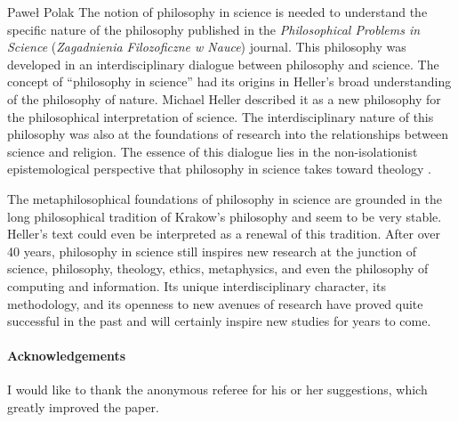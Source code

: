 \begin{artengenv}{Paweł Polak}
The notion of philosophy in science is needed to understand the specific nature of the philosophy published in the
\textit{Philosophical Problems in Science} (\textit{Zagadnienia Filozoficzne w Nauce}) journal. This philosophy was developed in
an interdisciplinary dialogue between philosophy and science. The concept of ``philosophy in science'' had its origins in
Heller’s broad understanding of the philosophy of nature. Michael Heller described it as a new philosophy for the
philosophical interpretation of science. The interdisciplinary nature of this philosophy was also at the foundations of
research into the relationships between science and religion. The essence of this dialogue lies in the non-isolationist
epistemological perspective that philosophy in science takes toward theology
\parencite{pol_polak_teologia_2015}.

The metaphilosophical foundations of philosophy in science are grounded in the long philosophical tradition of Krakow’s
philosophy and seem to be very stable. Heller’s text could even be interpreted as a renewal of this tradition. After
over 40 years, philosophy in science still inspires new research at the junction of science, philosophy, theology,
ethics, metaphysics, and even the philosophy of computing and information. Its unique interdisciplinary character, its
methodology, and its openness to new avenues of research have proved quite successful in the past and will certainly
inspire new studies for years to come.

\paragraph{Acknowledgements}
I would like to thank the anonymous referee for his or her suggestions, which greatly improved the paper.








\end{artengenv}
